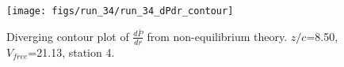 \begin{figure}[H]
\centering
\texttt{[image: figs/run\_34/run\_34\_dPdr\_contour]}
\caption{Diverging contour plot of $\frac{d\bar{P}}{dr}$ from non-equilibrium theory. $z/c$=8.50, $V_{free}$=21.13, station 4.}
\label{fig:run_34_dPdr_contour}
\end{figure}



